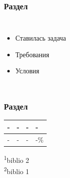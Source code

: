 \begin{frame}
\frametitle{Раздел}
\begin{columns}[T]

    \begin{itemize}
        \item Ставилась задача 
        \item Требования
        \item Условия
    \end{itemize}

    \begin{block}{\centering}
        \vspace{1mm}
        \centering
    \end{block}
\end{columns}
\end{frame}

\begin{frame}
\frametitle{Раздел}

\begin{table}[htbp]
    \centering
    \renewcommand{\arraystretch}{1}
    \begin{tabular}{|>{\raggedright\arraybackslash}p{4.5cm}|>{\centering\arraybackslash}p{4.5cm}|>{\centering\arraybackslash}p{3cm}|>{\centering\arraybackslash}p{1.5cm}|}
    \hline
    \textbf{-} & \textbf{-} & \textbf{-} & \textbf{-} \\
    \hline
    - & - & - & -\% \\
    \hline
\end{tabular}
\end{table}
    
    \vspace{0.5em}
    
    \noindent\textsuperscript{1}biblio 2\\
    \textsuperscript{2}biblio 1
    
\end{frame}
